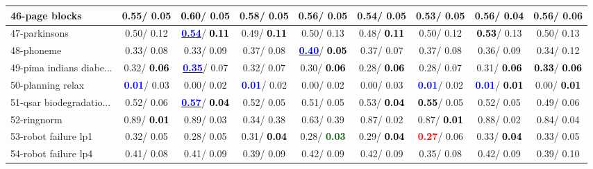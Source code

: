 \begin{table}[h]
\begin{center}
\begin{tabular}{lc|c|c|c|c|c|c|c}
46-page blocks &   0.55/  0.05 & \textcolor{black}{\textbf{  0.60}}/  0.05 &   0.58/  0.05 &   0.56/  0.05 &   0.54/  0.05 &   0.53/  0.05 &   0.56/\textcolor{black}{\textbf{  0.04}} &   0.56/  0.06 \\ \hline
47-parkinsons &   0.50/  0.12 & \underline{\textcolor{blue}{\textbf{  0.54}}}/\textcolor{black}{\textbf{  0.11}} &   0.49/\textcolor{black}{\textbf{  0.11}} &   0.50/  0.13 &   0.48/\textcolor{black}{\textbf{  0.11}} &   0.50/  0.12 & \textcolor{black}{\textbf{  0.53}}/  0.13 &   0.50/  0.13 \\
48-phoneme &   0.33/  0.08 &   0.33/  0.09 &   0.37/  0.08 & \underline{\textcolor{blue}{\textbf{  0.40}}}/\textcolor{black}{\textbf{  0.05}} &   0.37/  0.07 &   0.37/  0.08 &   0.36/  0.09 &   0.34/  0.12 \\
49-pima indians diabe... &   0.32/\textcolor{black}{\textbf{  0.06}} & \underline{\textcolor{blue}{\textbf{  0.35}}}/  0.07 &   0.32/  0.07 &   0.30/\textcolor{black}{\textbf{  0.06}} &   0.28/\textcolor{black}{\textbf{  0.06}} &   0.28/  0.07 &   0.31/\textcolor{black}{\textbf{  0.06}} & \textcolor{black}{\textbf{  0.33}}/\textcolor{black}{\textbf{  0.06}} \\
50-planning relax & \textcolor{blue}{\textbf{  0.01}}/  0.03 &   0.00/  0.02 & \textcolor{blue}{\textbf{  0.01}}/  0.02 &   0.00/  0.02 &   0.00/  0.03 & \textcolor{blue}{\textbf{  0.01}}/  0.02 & \textcolor{blue}{\textbf{  0.01}}/\textcolor{black}{\textbf{  0.01}} &   0.00/\textcolor{black}{\textbf{  0.01}} \\
51-qsar biodegradatio... &   0.52/  0.06 & \underline{\textcolor{blue}{\textbf{  0.57}}}/\textcolor{black}{\textbf{  0.04}} &   0.52/  0.05 &   0.51/  0.05 &   0.53/\textcolor{black}{\textbf{  0.04}} & \textcolor{black}{\textbf{  0.55}}/  0.05 &   0.52/  0.05 &   0.49/  0.06 \\
52-ringnorm &   0.89/\textcolor{black}{\textbf{  0.01}} &   0.89/  0.03 &   0.34/  0.38 &   0.63/  0.39 &   0.87/  0.02 &   0.87/\textcolor{black}{\textbf{  0.01}} &   0.88/  0.02 &   0.84/  0.04 \\
53-robot failure lp1 &   0.32/  0.05 &   0.28/  0.05 &   0.31/\textcolor{black}{\textbf{  0.04}} &   0.28/\textcolor{darkgreen}{\textbf{  0.03}} &   0.29/\textcolor{black}{\textbf{  0.04}} & \textcolor{red}{\textbf{  0.27}}/  0.06 &   0.33/\textcolor{black}{\textbf{  0.04}} &   0.33/  0.05 \\ \hline
54-robot failure lp4 &   0.41/  0.08 &   0.41/  0.09 &   0.39/  0.09 &   0.42/  0.09 &   0.42/  0.09 &   0.35/  0.08 &   0.42/  0.09 &   0.39/  0.10 \\

\end{tabular}
\end{center}
\end{table}
